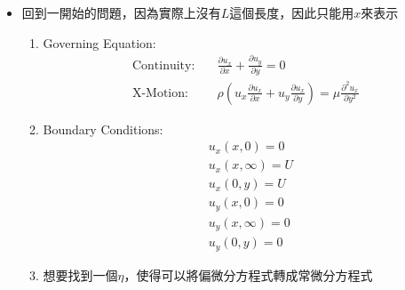 \documentclass[../main.tex]{subfiles}
\begin{document}
\begin{itemize}
\begin{itemize}
  如果$\frac{\rho U\delta^2}{\mu L} \gg 1$，則代表慣性力遠大於黏滯力\\
  等式右側的$\frac{\partial^2 u_x^\ast}{\partial {y^\ast}^2}$會很大\\
  代表流體不想水平的待著，會違反No slip\\
  如果$\frac{\rho U\delta^2}{\mu L} \ll 1$，則代表黏滯力遠大於慣性力\\
  會沒有Free Stream的現象，邊界層無法發展\\
  因此必須要差不多是1，才能有邊界層的發展\\
  因此可以得到:
  \begin{equation}
    \frac{\rho U\delta^2}{\mu L} \approx 1 \implies \boxed{\delta(x) \sim \sqrt{\frac{\mu L}{\rho U}} \propto \sqrt{L}}
  \end{equation}
  也就是說，上圖的紅色線，大概會是$\delta(x) = C\sqrt{x}$的形式\\
  另外，我們若將其同除以$L$，會發現邊界層發展速率，與雷諾數的關係
  \begin{equation}
    \boxed{\frac{\delta(x)}{L} \sim \sqrt{\frac{\mu}{\rho U L}} = \text{Re}_L^{-\frac{1}{2}}} \label{eq:ch2_5_boundary_layer_dev_delta_Re}
  \end{equation}
  \item 回到一開始的問題，因為實際上沒有$L$這個長度，因此只能用$x$來表示
  \begin{enumerate}
    \item Governing Equation:
    \begin{align}
      \text{Continuity:}\quad & \frac{\partial u_x}{\partial x} + \frac{\partial u_y}{\partial y} = 0\nonumber\\
      \text{X-Motion:} \quad & \rho\left(
        u_x \frac{\partial u_x}{\partial x} +
        u_y \frac{\partial u_x}{\partial y}
      \right) = \mu \frac{\partial^2 u_x}{\partial y^2}
    \end{align}
    \item Boundary Conditions:
    \begin{align}
      &u_x(x,0) = 0 \\
      &u_x(x,\infty) = U \\
      &u_x(0,y) = U\\
      &u_y(x,0) = 0\\
      &u_y(x,\infty) = 0\\
      &u_y(0,y) = 0
    \end{align}
    \item 想要找到一個$\eta$，使得可以將偏微分方程式轉成常微分方程式\\

\end{enumerate}
\end{itemize}
\end{itemize}
\end{document}
